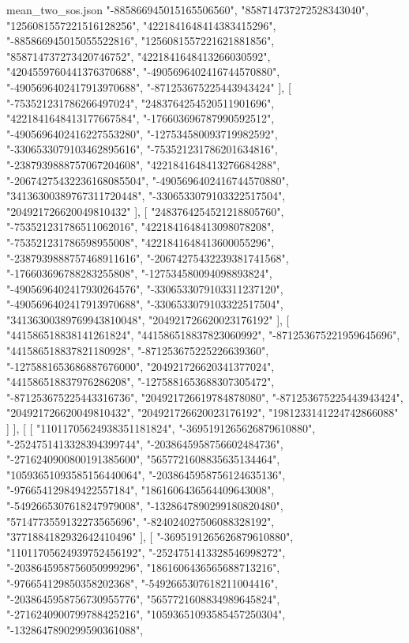 \begin{filecontents*}[overwrite]{mean_two_sos.json}
    "-885866945015165506560",
    "858714737272528343040",
    "1256081557221516128256",
    "4221841648414383415296",
    "-885866945015055522816",
    "1256081557221621881856",
    "858714737273420746752",
    "4221841648413266030592",
    "4204559760441376370688",
    "-4905696402416744570880",
    "-4905696402417913970688",
    "-871253675225443943424"
   ],
   [
    "-753521231786266497024",
    "2483764254520511901696",
    "4221841648413177667584",
    "-176603696787990592512",
    "-4905696402416227553280",
    "-127534580093719982592",
    "-3306533079103462895616",
    "-753521231786201634816",
    "-2387939888757067204608",
    "4221841648413276684288",
    "-20674275432236168085504",
    "-4905696402416744570880",
    "34136300389767311720448",
    "-3306533079103322517504",
    "204921726620049810432"
   ],
   [
    "2483764254521218805760",
    "-753521231786511062016",
    "4221841648413098078208",
    "-753521231786598955008",
    "4221841648413600055296",
    "-2387939888757468911616",
    "-20674275432239381741568",
    "-176603696788283255808",
    "-127534580094098893824",
    "-4905696402417930264576",
    "-3306533079103311237120",
    "-4905696402417913970688",
    "-3306533079103322517504",
    "34136300389769943810048",
    "204921726620023176192"
   ],
   [
    "441586518838141261824",
    "441586518837823060992",
    "-871253675221959645696",
    "441586518837821180928",
    "-871253675225226639360",
    "-1275881653686887676000",
    "204921726620341377024",
    "441586518837976286208",
    "-1275881653688307305472",
    "-871253675225443316736",
    "204921726619784878080",
    "-871253675225443943424",
    "204921726620049810432",
    "204921726620023176192",
    "1981233141224742866088"
   ]
  ],
  [
   [
    "11011705624938351181824",
    "-3695191265626879610880",
    "-2524751413328394399744",
    "-2038645958756602484736",
    "-2716240900800191385600",
    "5657721608835635134464",
    "10593651093585156440064",
    "-2038645958756124635136",
    "-976654129849422557184",
    "1861606436564409643008",
    "-5492665307618247979008",
    "-1328647890299180820480",
    "5714773559132273565696",
    "-824024027506088328192",
    "3771884182932642410496"
   ],
   [
    "-3695191265626879610880",
    "11011705624939752456192",
    "-2524751413328546998272",
    "-2038645958756050999296",
    "1861606436565688713216",
    "-976654129850358202368",
    "-5492665307618211004416",
    "-2038645958756730955776",
    "5657721608834989645824",
    "-2716240900799788425216",
    "10593651093585457250304",
    "-1328647890299590361088",

\end{filecontents*}
